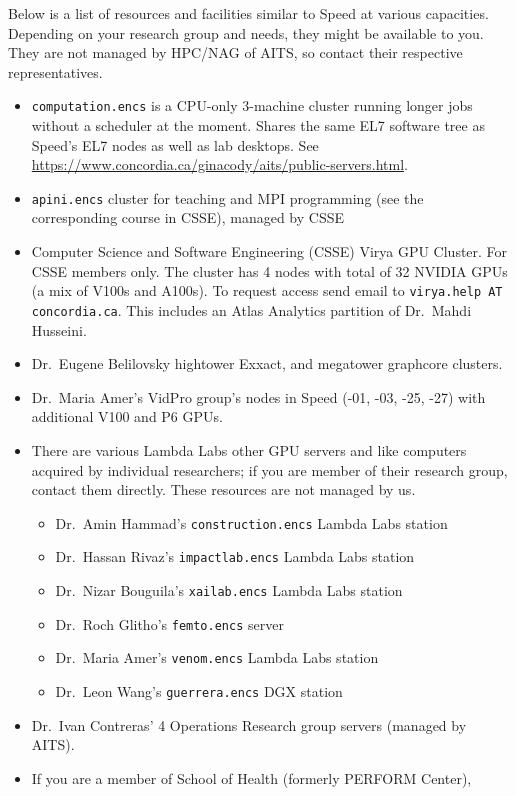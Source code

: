 \documentclass{easychair}
\begin{document}
Below is a list of resources and facilities similar to Speed at various capacities.
Depending on your research group and needs, they might be available to you. They
are not managed by HPC/NAG of AITS, so contact their respective representatives.

\begin{itemize}
\item
\texttt{computation.encs} is a CPU-only 3-machine cluster running longer jobs
without a scheduler at the moment. Shares the same EL7 software tree as Speed's EL7 nodes
as well as lab desktops.
See \url{https://www.concordia.ca/ginacody/aits/public-servers.html}.
\item
\texttt{apini.encs} cluster for teaching and MPI programming (see the corresponding
course in CSSE), managed by CSSE
\item
Computer Science and Software Engineering (CSSE) Virya GPU Cluster. For CSSE 
members only. The cluster has 4 nodes with total of 32 NVIDIA GPUs (a mix of
V100s and A100s). To request access send email to \texttt{virya.help AT concordia.ca}.
This includes an Atlas Analytics partition of Dr.~Mahdi Husseini.
\item
Dr.~Eugene Belilovsky hightower Exxact, and megatower graphcore clusters.
\item
Dr.~Maria Amer's VidPro group's nodes in Speed (-01, -03, -25, -27) with additional V100 and P6 GPUs.
\item
There are various Lambda Labs other GPU servers and like computers
acquired by individual researchers; if you are member of their
research group, contact them directly. These resources are not
managed by us.
\begin{itemize}
\item
Dr.~Amin Hammad's \texttt{construction.encs} Lambda Labs station
\item
Dr.~Hassan Rivaz's \texttt{impactlab.encs} Lambda Labs station
\item
Dr.~Nizar Bouguila's \texttt{xailab.encs} Lambda Labs station
\item
Dr.~Roch Glitho's \texttt{femto.encs} server
\item
Dr.~Maria Amer's \texttt{venom.encs} Lambda Labs station
\item
Dr.~Leon Wang's \texttt{guerrera.encs} DGX station
\end{itemize}
\item
Dr.~Ivan Contreras' 4 Operations Research group servers (managed by AITS).
\item
If you are a member of School of Health (formerly PERFORM Center),

\end{itemize}
\end{document}
